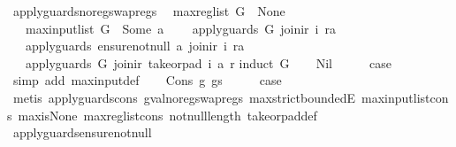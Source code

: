 \begin{isabellebody}
\ apply{\isacharunderscore}guards{\isacharunderscore}no{\isacharunderscore}reg{\isacharunderscore}swap{\isacharunderscore}regs{\isacharcolon}\isanewline
\ \ {\isachardoublequoteopen}max{\isacharunderscore}reg{\isacharunderscore}list\ G\ {\isacharequal}\ None\ {\isasymLongrightarrow}\isanewline
\ \ \ max{\isacharunderscore}input{\isacharunderscore}list\ G\ {\isacharless}\ Some\ a\ {\isasymLongrightarrow}\isanewline
\ \ \ apply{\isacharunderscore}guards\ G\ {\isacharparenleft}join{\isacharunderscore}ir\ i\ ra{\isacharparenright}\ {\isasymLongrightarrow}\isanewline
\ \ \ apply{\isacharunderscore}guards\ {\isacharparenleft}ensure{\isacharunderscore}not{\isacharunderscore}null\ a{\isacharparenright}\ {\isacharparenleft}join{\isacharunderscore}ir\ i\ ra{\isacharparenright}\ {\isasymLongrightarrow}\isanewline
\ \ \ apply{\isacharunderscore}guards\ G\ {\isacharparenleft}join{\isacharunderscore}ir\ {\isacharparenleft}take{\isacharunderscore}or{\isacharunderscore}pad\ i\ a{\isacharparenright}\ r{\isacharparenright}{\isachardoublequoteclose}\isanewline
%
\isadelimproof
%
\endisadelimproof
%
\isatagproof
{}\isamarkupfalse%
{\isacharparenleft}induct\ G{\isacharparenright}\isanewline
\ \ \isamarkupfalse%
\ Nil\isanewline
\ \ \isamarkupfalse%
\ \isamarkupfalse%
\ {\isacharquery}case\isanewline
\ \ \ \ \isamarkupfalse%
\ {\isacharparenleft}simp\ add{\isacharcolon}\ max{\isacharunderscore}input{\isacharunderscore}def{\isacharparenright}\isanewline
{}\isamarkupfalse%
\isanewline
\ \ \isamarkupfalse%
\ {\isacharparenleft}Cons\ g\ gs{\isacharparenright}\isanewline
\ \ \isamarkupfalse%
\ \isamarkupfalse%
\ {\isacharquery}case\isanewline
\ \ \ \ \isamarkupfalse%
\ {\isacharparenleft}metis\ apply{\isacharunderscore}guards{\isacharunderscore}cons\ gval{\isacharunderscore}no{\isacharunderscore}reg{\isacharunderscore}swap{\isacharunderscore}regs\ max{\isachardot}strict{\isacharunderscore}boundedE\ max{\isacharunderscore}input{\isacharunderscore}list{\isacharunderscore}cons\ max{\isacharunderscore}is{\isacharunderscore}None\ max{\isacharunderscore}reg{\isacharunderscore}list{\isacharunderscore}cons\ not{\isacharunderscore}null{\isacharunderscore}length\ take{\isacharunderscore}or{\isacharunderscore}pad{\isacharunderscore}def{\isacharparenright}\isanewline
{}\isamarkupfalse%
%
\endisatagproof
{\isafoldproof}%
%
\isadelimproof
\isanewline
%
\endisadelimproof
\isanewline
{}\isamarkupfalse%
\ apply{\isacharunderscore}guards{\isacharunderscore}ensure{\isacharunderscore}not{\isacharunderscore}null{\isacharcolon}\isanewline

\end{isabellebody}
